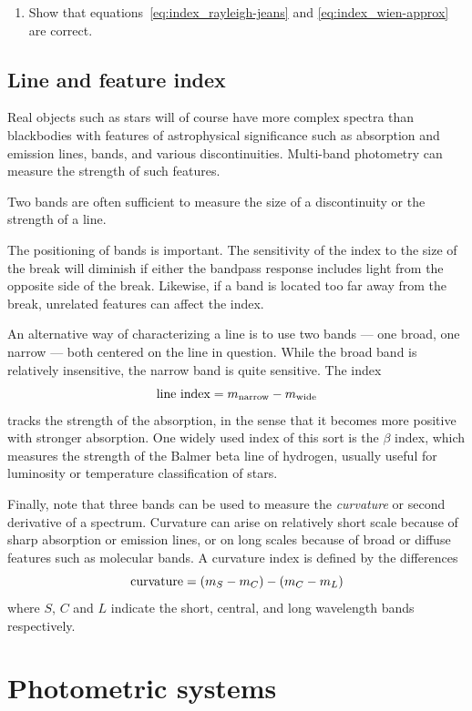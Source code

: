 \begin{enumerate}
\setcounter{enumi}{\value{count}}
\item Show that equations~\ref{eq:index_rayleigh-jeans} and
  \ref{eq:index_wien-approx} are correct.
\setcounter{count}{\value{enumi}} 
\end{enumerate}

\subsection{Line and feature index}
Real objects such as stars will of course have more complex spectra
than blackbodies with features of astrophysical significance such as
absorption and emission lines, bands, and various
discontinuities. Multi-band photometry can measure the strength of
such features. 

Two bands are often sufficient to measure the size of a discontinuity
or the strength of a line. 

The positioning of bands is important. The sensitivity of the index to
the size of the break will diminish if either the bandpass response
includes light from the opposite side of the break. Likewise, if a
band is located too far away from the break, unrelated features can
affect the index. 

An alternative way of characterizing a line is to use two bands ---
one broad, one narrow --- both centered on the line in question. While
the broad band is relatively insensitive, the narrow band is quite
sensitive. The index
\[
{\rm line~index}=m_{\rm narrow}-m_{\rm wide}
\]
tracks the strength of the absorption, in the sense that it becomes
more positive with stronger absorption. One widely used index of this
sort is the $\beta$ index, which measures the strength of the Balmer
beta line of hydrogen, usually useful for luminosity or temperature
classification of stars. 

Finally, note that three bands can be used to measure the {\it
  curvature} or second derivative of a spectrum. Curvature can arise
on relatively short scale because of sharp absorption or emission
lines, or on long scales because of broad or diffuse features such as
molecular bands. A curvature index is defined by the differences
\[
{\rm curvature}=(m_S-m_C)-(m_C-m_L)
\]
where $S$, $C$ and $L$ indicate the short, central, and long
wavelength bands respectively.

\section{Photometric systems}

